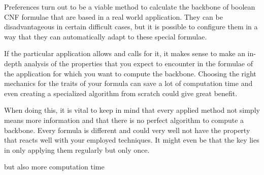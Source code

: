 Preferences turn out to be a viable method to calculate the backbone of boolean CNF formulae that are based in a real world application. They can be disadvantageous in certain difficult cases, but it is possible to configure them in a way that they can automatically adapt to these special formulae.

If the particular application allows and calls for it, it makes sense to make an in-depth analysis of the properties that you expect to encounter in the formulae of the application for which you want to compute the backbone. Choosing the right mechanics for the traits of your formula can save a lot of computation time and even creating a specialized algorithm from scratch could give great benefit.

When doing this, it is vital to keep in mind that every applied method not simply means more information and that there is no perfect algorithm to compute a backbone. Every formula is different and could very well not have the property that reacts well with your employed techniques. It might even be that the key lies in only applying them regularly but only once.

 but also more computation time

\iffalse
TODO prefbones ist besser für echtwelt beispiele, ohne prefs zuverlässiger bei komplizierten beispielen

kombination aus strategien auf fallbeispiel optimieren(?)

Guiding the behaviour of the SAT solver using preferences can be very beneficial in the case of real world applications and where it would be disadvantageous, the penalty can be kept under control. 

nicht alles was algorithmisch erlaubt ist, bringt automatisch performance vorteile

die aggressivste methode muss nicht zwangsläufig irgend einen benefit bringen

future work dazu machen


\fi